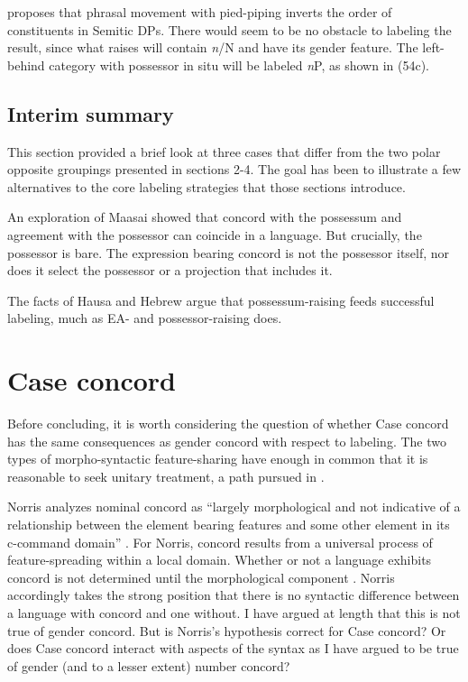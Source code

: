\documentclass[output=paper
,modfonts
,nonflat]{langsci/langscibook}
\begin{document}
\citet{Shlonsky2004} proposes that phrasal movement with pied-piping inverts the order of constituents in Semitic DPs. There would seem to be no obstacle to labeling the result, since what raises will contain \textit{n}/N and have its gender feature. The left-behind category with possessor in situ will be labeled \textit{n}P, as shown in (54c).

\subsection{Interim summary}
This section provided a brief look at three cases that differ from the two polar opposite groupings presented in sections 2-4. The goal has been to illustrate a few alternatives to the core labeling strategies that those sections introduce. 

An exploration of Maasai showed that concord with the possessum and agreement with the possessor can coincide in a language. But crucially, the possessor is bare. The expression bearing concord is not the possessor itself, nor does it select the possessor or a projection that includes it.  

The facts of Hausa and Hebrew argue that possessum-raising feeds successful labeling, much as EA- and possessor-raising does.

\section{Case concord}
Before concluding, it is worth considering the question of whether Case concord has the same consequences as gender concord with respect to labeling. The two types of morpho-syntactic feature-sharing have enough in common that it is reasonable to seek unitary treatment, a path pursued in \citealt{Norris2014}. 

Norris analyzes nominal concord as “largely morphological and not indicative of a relationship between the element bearing features and some other element in its c-command domain” \citep[98]{Norris2014}. For Norris, concord results from a universal process of feature-spreading within a local domain. Whether or not a language exhibits concord is not determined until the morphological component \citep[132]{Norris2014}. Norris accordingly takes the strong position that there is no syntactic difference between a language with concord and one without. I have argued at length that this is not true of gender concord. But is Norris's hypothesis correct for Case concord? Or does Case concord interact with aspects of the syntax as I have argued to be true of gender (and to a lesser extent) number concord?
\end{document}
